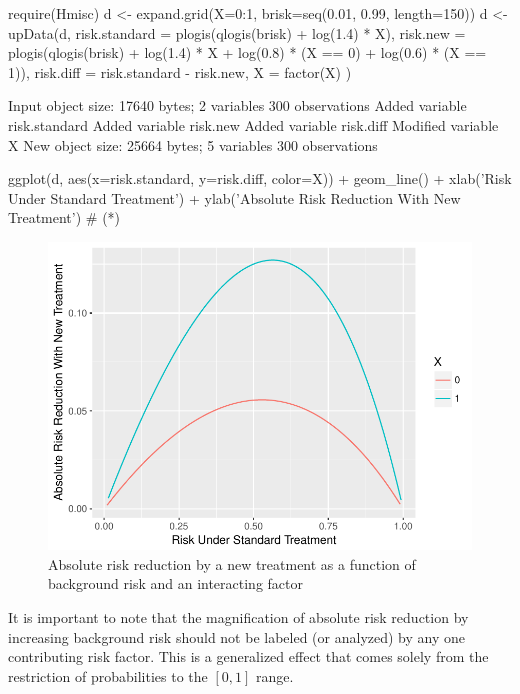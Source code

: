 \begin{Schunk}
\begin{Sinput}
require(Hmisc)
d <- expand.grid(X=0:1, brisk=seq(0.01, 0.99, length=150))
d <- upData(d,
            risk.standard = plogis(qlogis(brisk) + log(1.4) * X),
            risk.new      = plogis(qlogis(brisk) + log(1.4) * X +
                                     log(0.8) * (X == 0) +
                                     log(0.6) * (X == 1)),
            risk.diff     = risk.standard - risk.new,
            X = factor(X) )
\end{Sinput}
\begin{Soutput}
Input object size:	 17640 bytes;	 2 variables	 300 observations
Added variable		risk.standard
Added variable		risk.new
Added variable		risk.diff
Modified variable	X
New object size:	25664 bytes;	5 variables	300 observations
\end{Soutput}
\begin{Sinput}
ggplot(d, aes(x=risk.standard, y=risk.diff, color=X)) +
  geom_line() +
  xlab('Risk Under Standard Treatment') +
  ylab('Absolute Risk Reduction With New Treatment')   # (*\ipacue*)
\end{Sinput}
\begin{figure}[htbp]

\centerline{\includegraphics[width=\maxwidth]{ancova-ordiff-1} }

\caption[Absolute risk reduction by background risk and interacting factor]{Absolute risk reduction by a new treatment as a function of background risk and an interacting factor}\label{fig:ancova-ordiff}
\end{figure}
\end{Schunk}
It is important to note that the magnification of absolute risk
reduction by increasing background risk should not be labeled (or
analyzed) by any one contributing risk factor.  This is a generalized
effect that comes solely from the restriction of probabilities to the
$[0,1]$ range.


